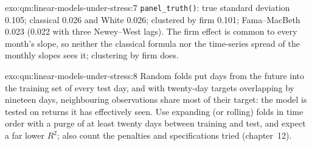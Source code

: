 \begin{solution}{exo:qm:linear-models-under-stress:7}
\texttt{panel\_truth()}: true standard deviation 0.105; classical 0.026 and White 0.026; clustered by firm 0.101; Fama--MacBeth 0.023 (0.022 with three
Newey--West lags). The firm effect is common to every month's slope, so neither the classical formula nor the time-series spread of the monthly
slopes sees it; clustering by firm does.
\end{solution}

\begin{solution}{exo:qm:linear-models-under-stress:8}
Random folds put days from the future into the training set of every test day, and with twenty-day targets overlapping by nineteen days,
neighbouring observations share most of their target: the model is tested on returns it has effectively seen. Use expanding (or rolling) folds in
time order with a purge of at least twenty days between training and test, and expect a far lower $R^2$; also count the penalties and
specifications tried (chapter~12).
\end{solution}

